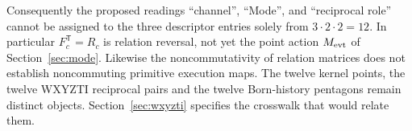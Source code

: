 Consequently the proposed readings ``channel'', ``Mode'', and ``reciprocal role'' cannot be assigned to the three descriptor entries solely from $3\cdot2\cdot2=12$. In particular $F_c^{\mathsf T}=R_c$ is relation reversal, not yet the point action $M_{\mathrm{evt}}$ of Section~\ref{sec:mode}. Likewise the noncommutativity of relation matrices does not establish noncommuting primitive execution maps. The twelve kernel points, the twelve WXYZTI reciprocal pairs and the twelve Born-history pentagons remain distinct objects. Section~\ref{sec:wxyzti} specifies the crosswalk that would relate them.
\endgroup
\setcounter{section}{2}
